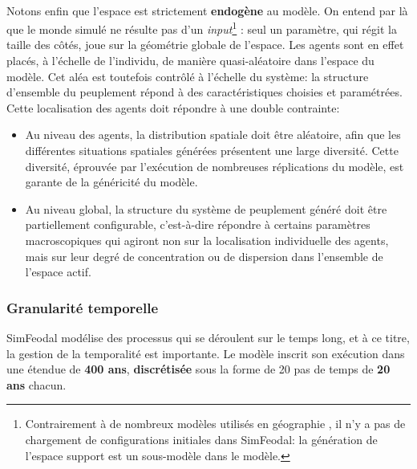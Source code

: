\paragraph[Endogène]{} Notons enfin que l'espace est strictement \textbf{endogène} au modèle.
On entend par là que le monde simulé ne résulte pas d'un \textit{input}\footnote{
	Contrairement à de nombreux modèles utilisés en géographie \autocites[etc.]{white_use_1997,white_high-resolution_2000,dubos-paillard_analyse_2003,benenson_schelling_2009}, il n'y a pas de chargement de configurations initiales dans SimFeodal: la génération de l'espace support est un sous-modèle dans le modèle.
} : seul un paramètre, qui régit la taille des côtés, joue sur la géométrie globale de l'espace.
Les agents sont en effet placés, à l'échelle de l'individu, de manière quasi-aléatoire dans l'espace du modèle.
Cet aléa est toutefois contrôlé à l'échelle du système: la structure d'ensemble du peuplement répond à des caractéristiques choisies et paramétrées.
Cette localisation des agents doit répondre à une double contrainte:
\begin{itemize}
	\item Au niveau des agents, la distribution spatiale doit être aléatoire, afin que les différentes situations spatiales générées présentent une large diversité.
	Cette diversité, éprouvée par l'exécution de nombreuses réplications du modèle, est garante de la généricité du modèle.
	\item Au niveau global, la structure du système de peuplement généré doit être partiellement configurable, c'est-à-dire répondre à certains paramètres macroscopiques qui agiront non sur la localisation individuelle des agents, mais sur leur degré de concentration ou de dispersion dans l'ensemble de l'espace \og actif\fg{}.
\end{itemize}


\subsubsection{Granularité temporelle}

SimFeodal modélise des processus qui se déroulent sur le temps long, et à ce titre, la gestion de la temporalité est importante.
Le modèle inscrit son exécution dans une étendue de \textbf{400 ans}, \textbf{discrétisée} sous la forme de 20 pas de temps de \textbf{20 ans} chacun.


